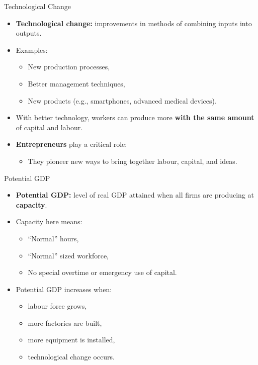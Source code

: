 \documentclass[aspectratio=169]{beamer}
\begin{document}
\begin{frame}{Technological Change}
\transfade
\begin{itemize}[<+->]
  \item \textbf{Technological change:} improvements in methods of combining inputs into outputs.
  \item Examples:
  \begin{itemize}[<+->]
    \item New production processes,
    \item Better management techniques,
    \item New products (e.g., smartphones, advanced medical devices).
  \end{itemize}
  \item With better technology, workers can produce more \textbf{with the same amount} of capital and labour.
  \item \textbf{Entrepreneurs} play a critical role:
  \begin{itemize}[<+->]
    \item They pioneer new ways to bring together labour, capital, and ideas.
  \end{itemize}
\end{itemize}
\end{frame}


\begin{frame}{Potential GDP}
\transfade
\begin{itemize}[<+->]
  \item \textbf{Potential GDP:} level of real GDP attained when all firms are producing at \textbf{capacity}.
  \item Capacity here means:
  \begin{itemize}[<+->]
    \item “Normal” hours,
    \item “Normal” sized workforce,
    \item No special overtime or emergency use of capital.
  \end{itemize}
  \item Potential GDP increases when:
  \begin{itemize}[<+->]
    \item labour force grows,
    \item more factories are built,
    \item more equipment is installed,
    \item technological change occurs.
  \end{itemize}
\end{itemize}
\end{frame}
\end{document}
